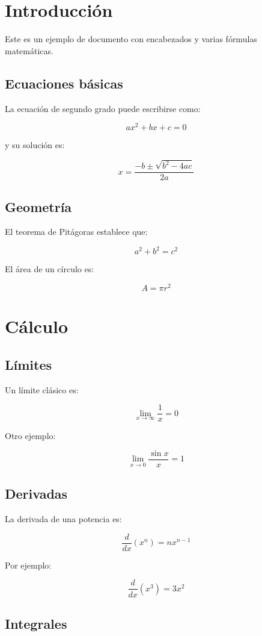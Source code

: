 \section{Introducción}

Este es un ejemplo de documento con encabezados y varias fórmulas matemáticas.

\subsection{Ecuaciones básicas}

La ecuación de segundo grado puede escribirse como:

\[
ax^2 + bx + c = 0
\]

y su solución es:

\[
x = \frac{-b \pm \sqrt{b^2 - 4ac}}{2a}
\]

\subsection{Geometría}

El teorema de Pitágoras establece que:

\[
a^2 + b^2 = c^2
\]

El área de un círculo es:

\[
A = \pi r^2
\]

\section{Cálculo}

\subsection{Límites}

Un límite clásico es:

\[
\lim_{x \to \infty} \frac{1}{x} = 0
\]

Otro ejemplo:

\[
\lim_{x \to 0} \frac{\sin x}{x} = 1
\]

\subsection{Derivadas}

La derivada de una potencia es:

\[
\frac{d}{dx}(x^n) = nx^{n-1}
\]

Por ejemplo:

\[
\frac{d}{dx}(x^3) = 3x^2
\]

\subsection{Integrales}

